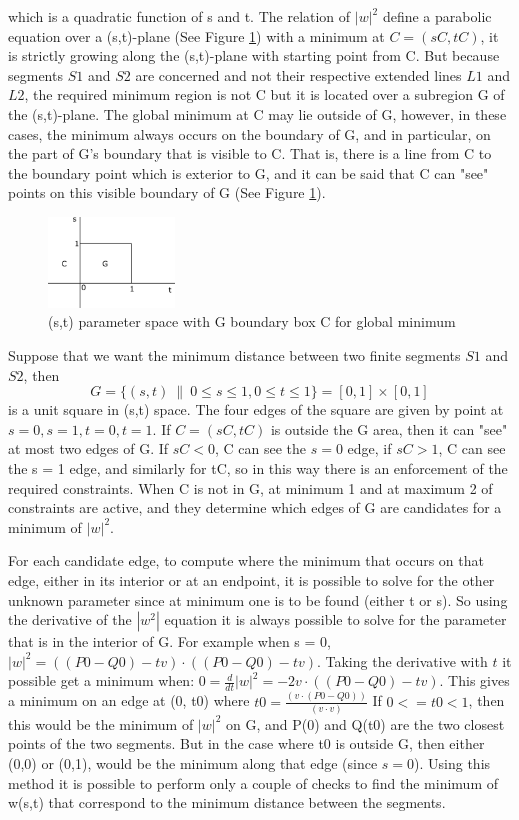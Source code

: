 \documentclass[times,12pt]{ACME2015article}
\begin{document}
which is a quadratic function of s and t. The relation of $|w|^2$ define a parabolic equation over a (s,t)-plane (See Figure \ref{fig9}) with a minimum at $C = (sC, tC)$, it is strictly growing along the (s,t)-plane with starting point from C. But because segments $S1$ and $S2$ are concerned and not their respective extended lines $L1$ and $L2$, the required minimum region is not C but it is located over a subregion G of the (s,t)-plane. The global minimum at C may lie outside of G, however, in these cases, the minimum always occurs on the boundary of G, and in particular, on the part of G's boundary that is visible to C. That is, there is a line from C to the boundary point which is exterior to G, and it can be said that C can "see" points on this visible boundary of G (See Figure \ref{fig9}).

\begin{figure}[!h]
\centering
\includegraphics[width=0.3\textwidth]{ss_box} \protect\caption{\label{fig9}(s,t) parameter space with G boundary box C for global minimum}
\end{figure} 

Suppose that we want the minimum distance between two finite segments $S1$ and $S2$, then 
$$G=\{ (s,t) \: \| \: 0 \leq s \leq 1, 0 \leq t \leq 1 \} = [0,1]\times[0,1]$$ 
is a unit square in (s,t) space. The four edges of the square are given by point at $s = 0, s = 1, t = 0, t = 1$. If $C = (sC, tC)$ is outside the G area, then it can "see" at most two edges of G. If $sC < 0$, C can see the $s = 0$ edge, if $sC > 1$, C can see the s = 1 edge, and similarly for tC, so in this way there is an enforcement of the required constraints. When C is not in G, at minimum 1 and at maximum 2 of constraints are active, and they determine which edges of G are candidates for a minimum of $|w| ^2$.
 
For each candidate edge, to compute where the minimum that occurs on that edge, either in its interior or at an endpoint, it is possible to solve for the other unknown parameter since at minimum one is to be found (either t or s). So using the derivative of the $|w^2|$ equation it is always possible to solve for the parameter that is in the interior of G. For example when s = 0, $|w|^2 = ((P0-Q0)-tv) \cdot ((P0-Q0)-tv)$. Taking the derivative with $t$ it possible get a minimum when: $0 = \frac{d}{dt}|w|^2 = -2v \cdot ((P0-Q0)-tv)$.
This gives a minimum on an edge at (0, t0) where $t0 = \frac{(v \cdot (P0-Q0))}{(v \cdot v)}$
If $0 <= t0 < 1$, then this would be the minimum of $|w|^2$ on G, and P(0) and Q(t0) are the two closest points of the two segments. But in the case where t0 is outside G, then either (0,0) or (0,1), would be the minimum along that edge (since $s=0$). Using this method it is possible to perform only a couple of checks to find the minimum of w(s,t) that correspond to the minimum distance between the segments.
\end{document}
